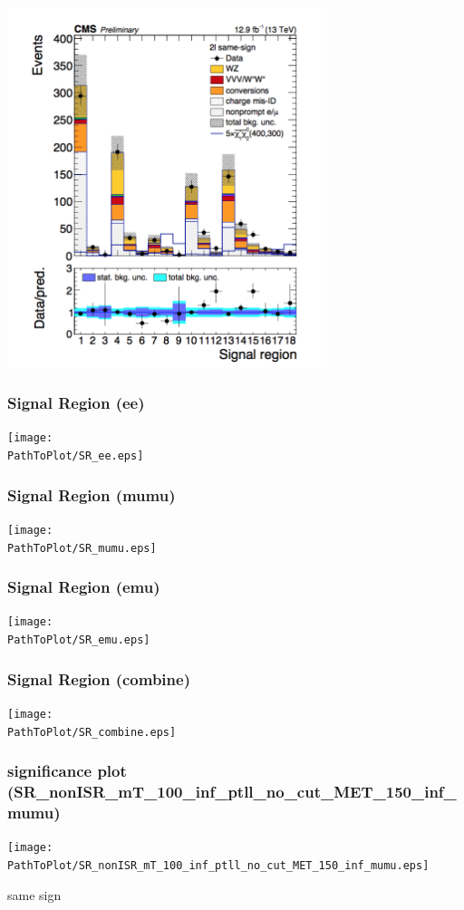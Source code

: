 \documentclass[mathserif,serif]{beamer}
\begin{document}
\begin{frame}
\includegraphics[width=0.7\textwidth]{data/photo/BG.png}
\end{frame}

\def \PathToPlot {../plot}
\begin{frame}
\frametitle{Signal Region (ee)}
\texttt{[image: \\PathToPlot/SR\_ee.eps]}
\end{frame}

\begin{frame}
\frametitle{Signal Region (mumu)}
\texttt{[image: \\PathToPlot/SR\_mumu.eps]}
\end{frame}

\begin{frame}
\frametitle{Signal Region (emu)}
\texttt{[image: \\PathToPlot/SR\_emu.eps]}
\end{frame}

\begin{frame}
\frametitle{Signal Region (combine)}
\texttt{[image: \\PathToPlot/SR\_combine.eps]}
\end{frame}

\begin{frame}
\frametitle{significance plot (SR\_nonISR\_mT\_100\_inf\_ptll\_no\_cut\_MET\_150\_inf\_mumu)}
\texttt{[image: \\PathToPlot/SR\_nonISR\_mT\_100\_inf\_ptll\_no\_cut\_MET\_150\_inf\_mumu.eps]}
\end{frame}

\begin{frame}
\begin{center}
\huge
same sign
\end{center}
\end{frame}

\def \PathToPlot {../plot}

\end{document}
